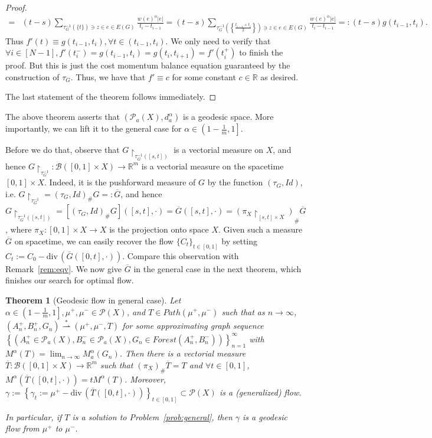 \documentclass[fleqn]{article}
\newtheorem{thm}{Theorem}[section]
\theoremstyle{definition}
\theoremstyle{remark}
\renewcommand{\l}[1][n]{\lim_{#1\rightarrow\infty}} %
\renewcommand{\P}{\mathcal{P}} %
\newcommand{\wstar}{\stackrel{*}{\rightharpoonup}} %
\begin{document}
\begin{proof}
\begin{align*}
= & (t-s) \sum_{\tau_G^{-1}(\{t\}) \ni z\in e\in E(G)} \frac{w(e)^\alpha|e|}{t_i-t_{i-1}} = (t-s) \sum_{\tau_G^{-1}\left(\left\{ \frac{t_{i-1}+t_i}{2} \right\}\right) \ni z\in e\in E(G)} \frac{w(e)^\alpha|e|}{t_i-t_{i-1}} =:(t-s) g(t_{i-1},t_i).
\end{align*}
Thus $f'(t)\equiv g(t_{i-1},t_i), \forall t \in(t_{i-1},t_i)$. We only need to verify that $\forall i\in[N-1], f'(t_i^-)=g(t_{i-1},t_i) = g(t_i,t_{i+1}) = f'(t_i^+)$ to finish the proof. But this is just the cost momentum balance equation guaranteed by the construction of $\tau_G$. Thus, we have that $f'\equiv c$ for some constant $c\in\mathbb{R}$ as desired.
\par
The last statement of the theorem follows immediately.
\end{proof}

\par
The above theorem asserts that $(\P_a(X),d_a^\alpha)$ is a geodesic space. More importantly, we can lift it to the general case for $\alpha\in \left(1-\frac{1}{m}, 1\right]$.
\par
Before we do that, observe that $G\!\!\restriction_{\tau_G^{-1}\left([s,t]\right)}$ is a vectorial measure on $X$, and hence $G\!\!\restriction_{\tau_G^{-1}}: \mathcal{B}\left([0,1] \times X \right) \rightarrow \mathbb{R}^m$ is a vectorial measure on the spacetime $[0,1] \times X$. Indeed, it is the pushforward measure of $G$ by the function $(\tau_G,Id)$, i.e. $G\!\!\restriction_{\tau_G^{-1}} = (\tau_G,Id)_\# G =:\overline{G}$, and hence $G\!\!\restriction_{\tau_G^{-1}([s,t])} = \left[(\tau_G,Id)_\# G\right]\left([s,t],\cdot \right) =\overline{G}([s,t],\cdot) =\left(\pi_X\!\!\restriction_{[s,t]\times X}\right)_\# \overline{G}$, where $\pi_X:[0,1]\times X \rightarrow X$ is the projection onto space $X$. Given such a measure $\overline{G}$ on spacetime, we can easily recover the flow $\{C_t\}_{t\in[0,1]}$ by setting $C_t:=C_0 - \mathrm{div}\,\left( \overline{G}([0,t],\cdot) \right)$. Compare this observation with Remark~\ref{rem:eqv}. We now give $\overline{G}$ in the general case in the next theorem, which finishes our search for optimal flow.

\begin{thm}[Geodesic flow in general case]
Let $\alpha\in \left(1-\frac{1}{m},1\right], \mu^+, \mu^- \in\P(X)$, and $T\in Path(\mu^+,\mu^-)$ such that as $n\rightarrow \infty$, $(A_n^+,B_n^+,G_n) \wstar (\mu^+,\mu^-,T)$ for some approximating graph sequence $\left\{\left(A_n^+\in\P_a(X), B_n^-\in\P_a(X), G_n\in Forest(A_n^+,B_n^-) \right)\right\}_{n=1}^\infty$ with $M^\alpha(T)=\l M_a^\alpha(G_n)$. Then there is a vectorial measure $\overline{T}:\mathcal{B}\left([0,1] \times X\right) \rightarrow \mathbb{R}^m$ such that $\left(\pi_X\right)_\# \overline{T}=T$ and $\forall t\in[0,1]$, $M^\alpha \left( \overline{T}([0,t],\cdot) \right)=t M^\alpha(T)$. Moreover, $\gamma:= \left\{\gamma_t:=\mu^+ - \mathrm{div}\,\left( \overline{T}([0,t],\cdot) \right) \right\}_{t\in[0,1]} \subset \P(X)$ is a (generalized) flow.
\par
In particular, if $T$ is a solution to Problem~\ref{prob:general}, then $\gamma$ is a geodesic flow from $\mu^+$ to $\mu^-$.
\end{thm}
\end{document}
